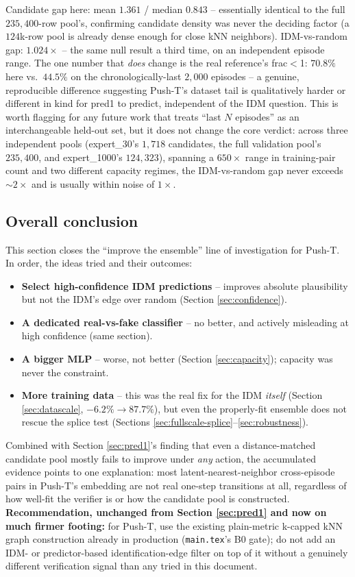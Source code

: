 \documentclass[11pt]{article}
\begin{document}
Candidate gap here: mean $1.361$ / median $0.843$ -- essentially identical to the full
$235{,}400$-row pool's, confirming candidate density was never the deciding factor (a
$124$k-row pool is already dense enough for close kNN neighbors). IDM-vs-random gap:
$1.024\times$ -- the same null result a third time, on an independent episode range. The one
number that \emph{does} change is the real reference's frac$<$1: $70.8\%$ here vs.\ $44.5\%$ on
the chronologically-last $2{,}000$ episodes -- a genuine, reproducible difference suggesting
Push-T's dataset tail is qualitatively harder or different in kind for pred1 to predict,
independent of the IDM question. This is worth flagging for any future work that treats ``last
$N$ episodes'' as an interchangeable held-out set, but it does not change the core verdict:
across three independent pools (expert\_30's $1{,}718$ candidates, the full validation pool's
$235{,}400$, and expert\_1000's $124{,}323$), spanning a $650\times$ range in training-pair
count and two different capacity regimes, the IDM-vs-random gap never exceeds $\sim\!2\times$
and is usually within noise of $1\times$.

\subsection{Overall conclusion}

This section closes the ``improve the ensemble'' line of investigation for Push-T. In order,
the ideas tried and their outcomes:

\begin{itemize}[leftmargin=1.4em,itemsep=2pt]
\item \textbf{Select high-confidence IDM predictions} -- improves absolute plausibility but
not the IDM's edge over random (Section \ref{sec:confidence}).
\item \textbf{A dedicated real-vs-fake classifier} -- no better, and actively misleading at
high confidence (same section).
\item \textbf{A bigger MLP} -- worse, not better (Section \ref{sec:capacity}); capacity was
never the constraint.
\item \textbf{More training data} -- this was the real fix for the IDM \emph{itself}
(Section \ref{sec:datascale}, $-6.2\%\to87.7\%$), but even the properly-fit ensemble does not
rescue the splice test (Sections \ref{sec:fullscale-splice}--\ref{sec:robustness}).
\end{itemize}

Combined with Section \ref{sec:pred1}'s finding that even a distance-matched candidate pool
mostly fails to improve under \emph{any} action, the accumulated evidence points to one
explanation: most latent-nearest-neighbor cross-episode pairs in Push-T's embedding are not
real one-step transitions at all, regardless of how well-fit the verifier is or how the
candidate pool is constructed. \textbf{Recommendation, unchanged from Section \ref{sec:pred1}
and now on much firmer footing:} for Push-T, use the existing plain-metric k-capped kNN graph
construction already in production (\texttt{main.tex}'s B0 gate); do not add an IDM- or
predictor-based identification-edge filter on top of it without a genuinely different
verification signal than any tried in this document.
\end{document}

